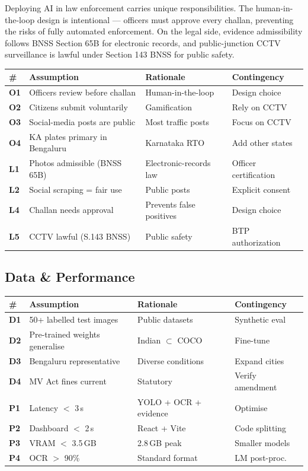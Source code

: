 \documentclass[11pt,a4paper]{article}
\begin{document}
Deploying AI in law enforcement carries unique responsibilities. The human-in-the-loop design is intentional — officers must approve every challan, preventing the risks of fully automated enforcement. On the legal side, evidence admissibility follows BNSS Section 65B for electronic records, and public-junction CCTV surveillance is lawful under Section 143 BNSS for public safety.

\begin{longtable}{@{}>{\bfseries}p{0.7cm}p{4.5cm}p{4cm}p{3cm}@{}}
\hline
\textbf{\#} & \textbf{Assumption} & \textbf{Rationale} & \textbf{Contingency} \\
\hline
O1 & Officers review before challan & Human-in-the-loop & Design choice \\
O2 & Citizens submit voluntarily & Gamification & Rely on CCTV \\
O3 & Social-media posts are public & Most traffic posts & Focus on CCTV \\
O4 & KA plates primary in Bengaluru & Karnataka RTO & Add other states \\
L1 & Photos admissible (BNSS 65B) & Electronic-records law & Officer certification \\
L2 & Social scraping = fair use & Public posts & Explicit consent \\
L4 & Challan needs approval & Prevents false positives & Design choice \\
L5 & CCTV lawful (S.143 BNSS) & Public safety & BTP authorization \\
\hline
\end{longtable}

\subsection{Data \& Performance}

\begin{longtable}{@{}>{\bfseries}p{0.7cm}p{4.5cm}p{4cm}p{3cm}@{}}
\hline
\textbf{\#} & \textbf{Assumption} & \textbf{Rationale} & \textbf{Contingency} \\
\hline
D1 & 50+ labelled test images & Public datasets & Synthetic eval \\
D2 & Pre-trained weights generalise & Indian $\subset$ COCO & Fine-tune \\
D3 & Bengaluru representative & Diverse conditions & Expand cities \\
D4 & MV Act fines current & Statutory & Verify amendment \\
\hline
P1 & Latency $<$ 3\,s & YOLO + OCR + evidence & Optimise \\
P2 & Dashboard $<$ 2\,s & React + Vite & Code splitting \\
P3 & VRAM $<$ 3.5\,GB & 2.8\,GB peak & Smaller models \\
P4 & OCR $>$ 90\% & Standard format & LM post-proc. \\
\hline
\end{longtable}
\end{document}
